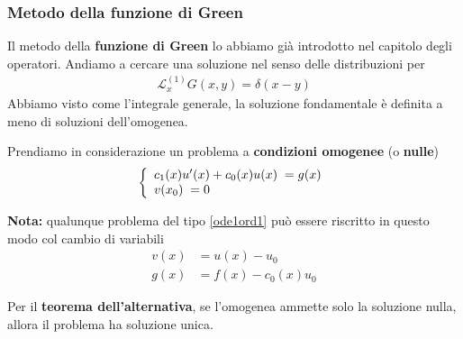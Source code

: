 \subsubsection{Metodo della funzione di Green} 
Il metodo della \textbf{funzione di Green} lo abbiamo già introdotto nel capitolo degli operatori. Andiamo a cercare una soluzione nel senso delle distribuzioni per
	\begin{align}
		\mathcal{L}^{(1)}_x G(x,y) = \delta(x-y) \label{green1}
	\end{align}
Abbiamo visto come l'integrale generale, la soluzione fondamentale è definita a meno di soluzioni dell'omogenea. 

Prendiamo in considerazione un problema a \textbf{condizioni omogenee} (o \textbf{nulle})
\begin{align}
	\left\{\begin{array}{c}
		c_1 (x) u'(x) + c_0(x) u(x) \; = g(x) \hfill \\
		v(x_0) \;  = 0 \hfill 
	\end{array}
	\right.
\end{align}

\textbf{Nota:} qualunque problema del tipo \ref{ode1ord1} può essere riscritto in questo modo col cambio di variabili
\begin{align}
	v(x) &= u(x) - u_0\\
	g(x) &= f(x) - c_0(x)u_0
\end{align}

Per il \textbf{teorema dell'alternativa}, se l'omogenea ammette solo la soluzione nulla, allora il problema ha soluzione unica.

